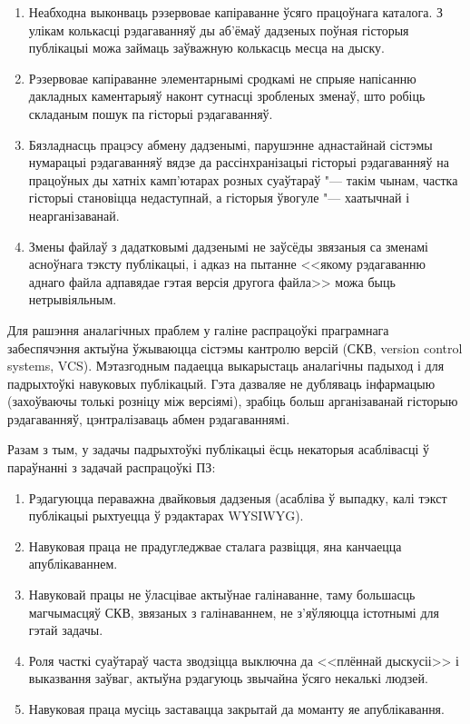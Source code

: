 \documentclass[10pt, a5paper]{article}
\begin{document}
\begin{enumerate}
  \item Неабходна выконваць рэзервовае капіраванне ўсяго працоўнага каталога. З улікам колькасці рэдагаванняў ды аб'ёмаў дадзеных поўная гісторыя публікацыі можа займаць заўважную колькасць месца на дыску.
  \item Рэзервовае капіраванне элементарнымі сродкамі не спрыяе напісанню дакладных каментарыяў наконт сутнасці зробленых зменаў, што робіць складаным пошук па гісторыі рэдагаванняў.
  \item Бязладнасць працэсу абмену дадзенымі, парушэнне аднастайнай сістэмы нумарацыі рэдагаванняў вядзе да рассінхранізацыі гісторыі рэдагаванняў на працоўных ды хатніх камп'ютарах розных суаўтараў "--- такім чынам, частка гісторыі становіцца недаступнай, а гісторыя ўвогуле "--- хаатычнай і неарганізаванай.
  \item Змены файлаў з дадатковымі дадзенымі не заўсёды звязаныя са зменамі асноўнага тэксту публікацыі, і адказ на пытанне <<якому рэдагаванню аднаго файла адпавядае гэтая версія другога файла>> можа быць нетрывіяльным.
\end{enumerate}

Для рашэння аналагічных праблем у галіне распрацоўкі праграмнага забеспячэння актыўна ўжываюцца сістэмы кантролю версій (СКВ, version control systems, VCS). Мэтазгодным падаецца выкарыстаць аналагічны падыход і для падрыхтоўкі навуковых публікацый. Гэта дазваляе не дубляваць інфармацыю (захоўваючы толькі розніцу між версіямі), зрабіць больш арганізаванай гісторыю рэдагаванняў, цэнтралізаваць абмен рэдагаваннямі.

Разам з тым, у задачы падрыхтоўкі публікацыі ёсць некаторыя асаблівасці ў параўнанні з задачай распрацоўкі ПЗ:

\begin{enumerate}
  \item Рэдагуюцца пераважна двайковыя дадзеныя (асабліва ў выпадку, калі тэкст публікацыі рыхтуецца ў рэдактарах \linebreak WYSIWYG).
  \item Навуковая праца не прадугледжвае сталага развіцця, яна канчаецца апублікаваннем.
  \item Навуковай працы не ўласцівае актыўнае галінаванне, таму большасць магчымасцяў СКВ, звязаных з галінаваннем, не з'яўляюцца істотнымі для гэтай задачы.
  \item Роля часткі суаўтараў часта зводзіцца выключна да <<плённай дыскусіі>> і выказвання заўваг, актыўна рэдагуюць звычайна ўсяго некалькі людзей.
  \item Навуковая праца мусіць заставацца закрытай да моманту яе апублікавання.
\end{enumerate}
\end{document}
